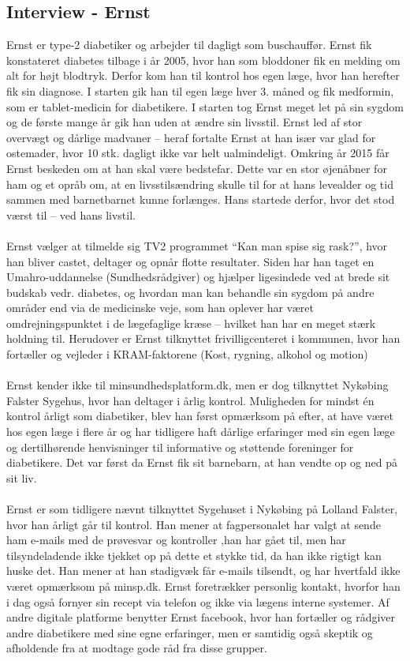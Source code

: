 \subsection{Interview - Ernst}
Ernst er type-2 diabetiker og arbejder til dagligt som buschauffør. Ernst fik konstateret diabetes tilbage i år 2005, hvor han som bloddoner fik en melding om alt for højt blodtryk. Derfor kom han til kontrol hos egen læge, hvor han herefter fik sin diagnose.
I starten gik han til egen læge hver 3. måned og fik medformin, som er tablet-medicin for diabetikere. I starten tog Ernst meget let på sin sygdom og de første mange år gik han uden at ændre sin livsstil. Ernst led af stor overvægt og dårlige madvaner – heraf fortalte Ernst at han især var glad for ostemader, hvor 10 stk. dagligt ikke var helt ualmindeligt.
Omkring år 2015 får Ernst beskeden om at han skal være bedstefar. Dette var en stor øjenåbner for ham og et opråb om, at en livsstilsændring skulle til for at hans levealder og tid sammen med barnetbarnet kunne forlænges. Hans startede derfor, hvor det stod værst til – ved hans livstil.
\\ \\
Ernst vælger at tilmelde sig TV2 programmet “Kan man spise sig rask?”, hvor han bliver castet, deltager og opnår flotte resultater. Siden har han taget en Umahro-uddannelse (Sundhedsrådgiver) og hjælper ligesindede ved at brede sit budskab vedr. diabetes, og hvordan man kan behandle sin sygdom på andre områder end via de medicinske veje, som han oplever har været omdrejningspunktet i de lægefaglige kræse – hvilket han har en meget stærk holdning til. Herudover er Ernst tilknyttet frivilligcenteret i kommunen, hvor han fortæller og vejleder i KRAM-faktorene (Kost, rygning, alkohol og motion)
\\ \\
Ernst kender ikke til minsundhedsplatform.dk, men er dog tilknyttet Nykøbing Falster Sygehus, hvor han deltager i årlig kontrol. Muligheden for mindst én kontrol årligt som diabetiker, blev han først opmærksom på efter, at have været hos egen læge i flere år og har tidligere haft dårlige erfaringer med sin egen læge og dertilhørende henvisninger til informative og støttende foreninger for diabetikere. Det var først da Ernst fik sit barnebarn, at han vendte op og ned på sit liv. 
\\ \\
Ernst er som tidligere nævnt tilknyttet Sygehuset i Nykøbing på Lolland Falster, hvor han årligt går til kontrol. Han mener at fagpersonalet har valgt at sende ham e-mails med de prøvesvar og kontroller ,han har gået til, men har tilsyndeladende ikke tjekket op på dette et stykke tid, da han ikke rigtigt kan huske det. Han mener at han stadigvæk får e-mails tilsendt, og har hvertfald ikke været opmærksom på minsp.dk. Ernst foretrækker personlig kontakt, hvorfor han i dag også fornyer sin recept via telefon og ikke via lægens interne systemer. Af andre digitale platforme benytter Ernst facebook, hvor han fortæller og rådgiver andre diabetikere med sine egne erfaringer, men er samtidig også skeptik og afholdende fra at modtage gode råd fra disse grupper.

